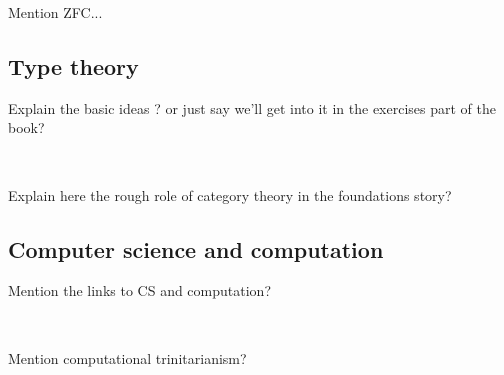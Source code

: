 Mention ZFC...



\subsection{Type theory}


Explain the basic ideas ? or just say we'll get into it in the exercises part of the book?

\


Explain here the rough role of category theory in the foundations story?


\subsection{Computer science and computation}

Mention the links to CS and computation?


\

Mention computational trinitarianism?
